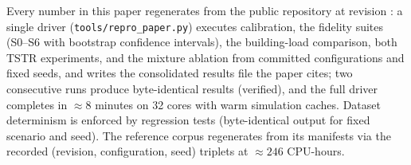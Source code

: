 Every number in this paper regenerates from the public repository at revision
:
a single driver (\texttt{tools/repro\_paper.py}) executes calibration, the
fidelity suites (S0--S6 with bootstrap confidence intervals), the
building-load comparison, both TSTR experiments, and the mixture ablation
from committed configurations and fixed seeds, and writes the consolidated
results file the paper cites; two consecutive runs produce byte-identical
results (verified), and the full driver completes in ${\approx}8$ minutes
on 32 cores with warm simulation caches. Dataset determinism is enforced by
regression tests (byte-identical output for fixed scenario and seed). The
reference corpus regenerates from its manifests via the recorded (revision,
configuration, seed) triplets at ${\approx}246$ CPU-hours.
